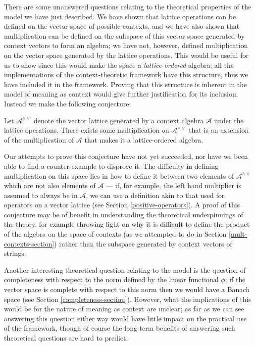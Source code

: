 There are some unanswered questions relating to the theoretical properties of the model we have just described. We have shown that lattice operations can be defined on the vector space of possible contexts, and we have also shown that multiplication can be defined on the subspace of this vector space generated by context vectors to form an algebra; we have not, however, defined multiplication on the vector space generated by the lattice operations. This would be useful for us to show since this would make the space a \emph{lattice-ordered} algebra; all the implementations of the context-theoretic framework have this structure, thus we have included it in the framework. Proving that this structure is inherent in the model of meaning as context would give further justification for its inclusion. Instead we make the following conjecture:
\begin{conj}\label{conjecture}
Let $\mathcal{A}^{\land\lor}$ denote the vector lattice generated by a context algebra $\mathcal{A}$ under the lattice operations. There exists some multiplication on $\mathcal{A}^{\land\lor}$ that is an extension of the multiplication of $\mathcal{A}$ that makes it a lattice-ordered algebra.
\end{conj}\noindent
Our attempts to prove this conjecture have not yet succeeded, nor have we been able to find a counter-example to disprove it. The difficulty in defining multiplication on this space lies in how to define it between two elements of  $\mathcal{A}^{\land\lor}$ which are not also elements of $\mathcal{A}$ --- if, for example, the left hand multiplier is assumed to always be in $\mathcal{A}$, we can use a definition akin to that used for operators on a vector lattice (see Section \ref{positive-operators}). A proof of this conjecture may be of benefit in understanding the theoretical underpinnings of the theory, for example throwing light on why it is difficult to define the product of the algebra on the space of contexts (as we attempted to do in Section \ref{mult-contexts-section}) rather than the subspace generated by context vectors of strings.

Another interesting theoretical question relating to the model is the question of completeness with respect to the norm defined by the linear functional $\phi$; if the vector space is complete with respect to this norm then we would have a Banach space (see Section \ref{completeness-section}). However, what the implications of this would be for the nature of meaning as context are unclear; as far as we can see answering this question either way would have little impact on the practical use of the framework, though of course the long term benefits of answering such theoretical questions are hard to predict.



